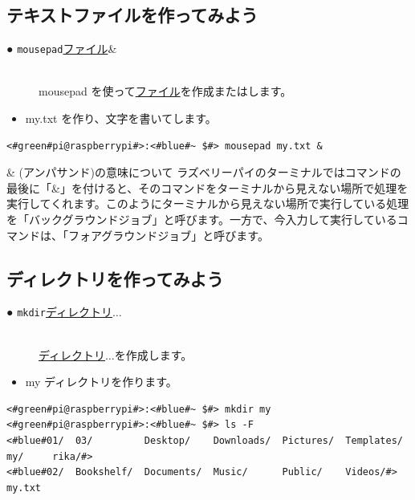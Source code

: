 \documentclass[text03.tex]{subfiles}
\begin{document}
\subsection{テキストファイルを作ってみよう}
\begin{description}
\item[● \texttt{mousepad}\textvisiblespace \underline{ファイル}\textvisiblespace \&]\mbox{}\\
mousepad を使って\underline{ファイル}を作成またはします。
\end{description}
\newpage
\begin{itemize}
\item[<例>]my.txt を作り、文字を書いてします。
\end{itemize}
\begin{lstlisting}[caption=mousepadの例, label=mousepad]
<#green#pi@raspberrypi#>:<#blue#~ $#> mousepad my.txt &
\end{lstlisting}

\begin{itembox}[c]{\& (アンパサンド)の意味について}
    ラズベリーパイのターミナルではコマンドの最後に「\&」を付けると、そのコマンドをターミナルから見えない場所で処理を実行してくれます。このようにターミナルから見えない場所で実行している処理を「バックグラウンドジョブ」と呼びます。一方で、今入力して実行しているコマンドは、「フォアグラウンドジョブ」と呼びます。
\end{itembox}

\subsection{ディレクトリを作ってみよう}
\begin{description}
\item[● \texttt{mkdir}\textvisiblespace \underline{ディレクトリ}$\ldots$]\mbox{}\\
\underline{ディレクトリ}$\ldots$を作成します。
\end{description}
\begin{itemize}
\item[<例>]my ディレクトリを作ります。
\end{itemize}
\begin{lstlisting}[caption=mkdirの例, label=mkdir]
<#green#pi@raspberrypi#>:<#blue#~ $#> mkdir my
<#green#pi@raspberrypi#>:<#blue#~ $#> ls -F
<#blue#01/  03/         Desktop/    Downloads/  Pictures/  Templates/   my/     rika/#>
<#blue#02/  Bookshelf/  Documents/  Music/      Public/    Videos/#>      my.txt
\end{lstlisting}
\end{document}
